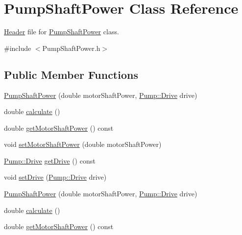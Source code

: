 \hypertarget{class_pump_shaft_power}{}\section{Pump\+Shaft\+Power Class Reference}
\label{class_pump_shaft_power}


\hyperlink{class_header}{Header} file for \hyperlink{class_pump_shaft_power}{Pump\+Shaft\+Power} class.  




{\ttfamily \#include $<$Pump\+Shaft\+Power.\+h$>$}

\subsection*{Public Member Functions}
\begin{DoxyCompactItemize}
\item 
\hyperlink{class_pump_shaft_power_a84d04978ce410d544a4c8d9eb393c92d}{Pump\+Shaft\+Power} (double motor\+Shaft\+Power, \hyperlink{class_pump_a32bf0ade131a11bb3b3fb374f638e983}{Pump\+::\+Drive} drive)
\item 
double \hyperlink{class_pump_shaft_power_aad32bf26469a5f2984c85ba07c3f84d9}{calculate} ()
\item 
double \hyperlink{class_pump_shaft_power_acb91eadb960f946ffee5373d4839a5be}{get\+Motor\+Shaft\+Power} () const
\item 
void \hyperlink{class_pump_shaft_power_a77b8c621c7c92841dbd00112437c413b}{set\+Motor\+Shaft\+Power} (double motor\+Shaft\+Power)
\item 
\hyperlink{class_pump_a32bf0ade131a11bb3b3fb374f638e983}{Pump\+::\+Drive} \hyperlink{class_pump_shaft_power_a3d6529d7f5ce8ef194af9abe5e6399b6}{get\+Drive} () const
\item 
void \hyperlink{class_pump_shaft_power_a2c35a110c65c582a6f7d1d4c714f8187}{set\+Drive} (\hyperlink{class_pump_a32bf0ade131a11bb3b3fb374f638e983}{Pump\+::\+Drive} drive)
\item 
\hyperlink{class_pump_shaft_power_a84d04978ce410d544a4c8d9eb393c92d}{Pump\+Shaft\+Power} (double motor\+Shaft\+Power, \hyperlink{class_pump_a32bf0ade131a11bb3b3fb374f638e983}{Pump\+::\+Drive} drive)
\item 
double \hyperlink{class_pump_shaft_power_aad32bf26469a5f2984c85ba07c3f84d9}{calculate} ()
\item 
double \hyperlink{class_pump_shaft_power_acb91eadb960f946ffee5373d4839a5be}{get\+Motor\+Shaft\+Power} () const
\item 

\end{DoxyCompactItemize}
